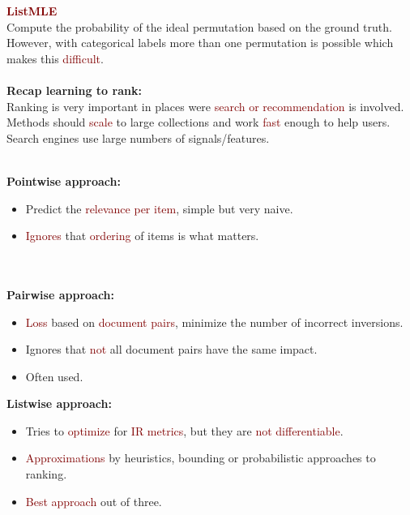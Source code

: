 {\Large \textbf{\textcolor{Maroon}{ListMLE}}} \\
Compute the probability of the ideal permutation based on the ground truth. However, with categorical labels more than one permutation is possible which makes this \textcolor{Maroon}{difficult}. \\
\\
{\Large \textbf{Recap learning to rank:}} \\
Ranking is very important in places were \textcolor{Maroon}{search or recommendation} is involved. Methods should \textcolor{Maroon}{scale} to large collections and work \textcolor{Maroon}{fast} enough to help users. Search engines use large numbers of signals/features. \\
\\
\begin{minipage}{0.33\textwidth}
\textbf{Pointwise approach:} 
\begin{itemize}
    \setlength\itemsep{0em}
    \item Predict the \textcolor{Maroon}{relevance per item}, simple but very naive.
    \item \textcolor{Maroon}{Ignores} that \textcolor{Maroon}{ordering} of items is what matters. \\
    \\
    \\
\end{itemize}
\end{minipage}
\begin{minipage}{0.33\textwidth}
\textbf{Pairwise approach:} 
\begin{itemize}
    \setlength\itemsep{0em}
    \item \textcolor{Maroon}{Loss} based on \textcolor{Maroon}{document pairs}, minimize the number of incorrect inversions.
    \item Ignores that \textcolor{Maroon}{not} all document pairs have the same impact.
    \item Often used. \\
\end{itemize}
\end{minipage}
\begin{minipage}{0.33\textwidth}
\textbf{Listwise approach:} 
\begin{itemize}
    \setlength\itemsep{0em}
    \item Tries to \textcolor{Maroon}{optimize} for \textcolor{Maroon}{IR metrics}, but they are \textcolor{Maroon}{not differentiable}.
    \item \textcolor{Maroon}{Approximations} by heuristics, bounding or probabilistic approaches to ranking.
    \item \textcolor{Maroon}{Best approach} out of three.
\end{itemize}
\end{minipage}

